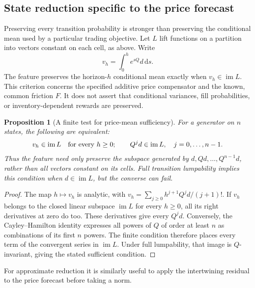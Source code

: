 \documentclass[11pt]{article}
\theoremstyle{plain}
\newtheorem{proposition}[theorem]{Proposition}
\theoremstyle{definition}
\theoremstyle{remark}
\newcommand{\dd}{\,\mathrm d}
\begin{document}
\subsection{State reduction specific to the price forecast}
\label{sec:pricesufficient}

Preserving every transition probability is stronger than preserving
the conditional mean used by a particular trading objective.
Let \(L\) lift functions on a partition into vectors constant on
each cell, as above. Write
\[
 v_h=\int_0^h e^{sQ}d\dd s.
\]
The feature preserves the horizon-\(h\) conditional mean exactly
when \(v_h\in\operatorname{im}L\). This criterion concerns the
specified additive price compensator and the known, common
friction \(F\). It does not assert that conditional variances,
fill probabilities, or inventory-dependent rewards are preserved.

\begin{proposition}[A finite test for price-mean sufficiency]
\label{prop:pricekrylov}
For a generator on \(n\) states, the following are equivalent:
\[
 v_h\in\operatorname{im}L\quad\hbox{for every }h\ge0;
 \qquad
 Q^j d\in\operatorname{im}L,\quad j=0,\ldots,n-1.
\]
Thus the feature need only preserve the subspace generated by
\(d,Qd,\ldots,Q^{n-1}d\), rather than all vectors constant on
its cells. Full transition lumpability implies this condition
when \(d\in\operatorname{im}L\), but the converse can fail.
\end{proposition}
\begin{proof}
The map \(h\mapsto v_h\) is analytic, with
\(v_h=\sum_{j\ge0}h^{j+1}Q^jd/(j+1)!\).
If \(v_h\) belongs to the closed linear subspace
\(\operatorname{im}L\) for every \(h\ge0\), all its right
derivatives at zero do too. These derivatives give every \(Q^jd\).
Conversely, the Cayley--Hamilton identity expresses all powers
of \(Q\) of order at least \(n\) as combinations of its first
\(n\) powers. The finite condition therefore places every term
of the convergent series in \(\operatorname{im}L\).
Under full lumpability, that image is \(Q\)-invariant, giving
the stated sufficient condition.
\end{proof}

For approximate reduction it is similarly useful to apply the
intertwining residual to the price forecast before taking a norm.
\end{document}
